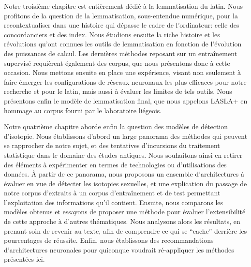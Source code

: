 Notre troisième chapitre est entièrement dédié à la lemmatisation du latin. Nous profitons de la question de la lemmatisation, sous-entendue numérique, pour la recontextualiser dans une histoire qui dépasse le cadre de l'ordinateur: celle des concordanciers et des index. Nous étudions ensuite la riche histoire et les révolutions qu'ont connues les outils de lemmatisation en fonction de l'évolution des puissances de calcul. Les dernières méthodes reposant sur un entraînement supervisé requièrent également des corpus, que nous présentons donc à cette occasion. Nous mettons ensuite en place une expérience, visant non seulement à faire émerger les configurations de réseaux neuronaux les plus efficaces pour notre recherche et pour le latin, mais aussi à évaluer les limites de tels outils. Nous présentons enfin le modèle de lemmatisation final, que nous appelons LASLA+ en hommage au corpus fourni par le laboratoire liégeois.

Notre quatrième chapitre aborde enfin la question des modèles de détection d'isotopie. Nous établissons d'abord un large panorama des méthodes qui peuvent se rapprocher de notre sujet, et des tentatives d'incursions du traitement statistique dans le domaine des études antiques. Nous souhaitons ainsi en retirer des éléments à expérimenter en termes de technologies ou d'utilisations des données. À partir de ce panorama, nous proposons un ensemble d'architectures à évaluer en vue de détecter les isotopies sexuelles, et une explication du passage de notre corpus d'extraits à un corpus d'entraînement et de test permettant l'exploitation des informations qu'il contient. Ensuite, nous comparons les modèles obtenus et essayons de proposer une méthode pour évaluer l'extensibilité de cette approche à d'autres thématiques. Nous analysons alors les résultats, en prenant soin de revenir au texte, afin de comprendre ce qui se \enquote{cache} derrière les pourcentages de réussite. Enfin, nous établissons des recommandations d'architectures neuronales pour quiconque voudrait ré-appliquer les méthodes présentées ici.


% 

